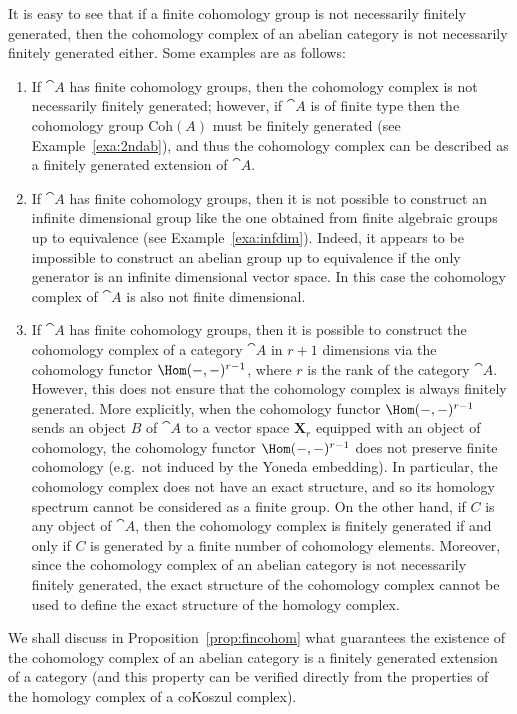 \documentclass[a4paper,reqno,oneside]{article}
\begin{document}
It is easy to see that if a finite cohomology group is not necessarily finitely generated, then the cohomology complex of an abelian category is not necessarily finitely generated either. Some examples are as follows:
\begin{enumerate}
    \item If $\cat{A}$ has finite cohomology groups, then the cohomology complex is not necessarily finitely generated; however, if $\cat{A}$ is of finite type then the cohomology group $\mathrm{Coh}(A)$ must be finitely generated (see Example~\ref{exa:2ndab}), and thus the cohomology complex can be described as a finitely generated extension of $\cat{A}$.
    \item If $\cat{A}$ has finite cohomology groups, then it is not possible to construct an infinite dimensional group like the one obtained from finite algebraic groups up to equivalence (see Example~\ref{exa:infdim}). Indeed, it appears to be impossible to construct an abelian group up to equivalence if the only generator is an infinite dimensional vector space. In this case the cohomology complex of $\cat{A}$ is also not finite dimensional.
    \item If $\cat{A}$ has finite cohomology groups, then it is possible to construct the cohomology complex of a category $\cat{A}$ in $r+1$ dimensions via the cohomology functor $\Hom(-,-)^{r-1}$, where $r$ is the rank of the category $\cat{A}$. However, this does not ensure that the cohomology complex is always finitely generated. More explicitly, when the cohomology functor $\Hom(-,-)^{r-1}$ sends an object $B$ of $\cat{A}$ to a vector space $\mathbf{X}_r$ equipped with an object of cohomology, the cohomology functor $\Hom(-,-)^{r-1}$ does not preserve finite cohomology (e.g.~not induced by the Yoneda embedding). In particular, the cohomology complex does not have an exact structure, and so its homology spectrum cannot be considered as a finite group. On the other hand, if $C$ is any object of $\cat{A}$, then the cohomology complex is finitely generated if and only if $C$ is generated by a finite number of cohomology elements. Moreover, since the cohomology complex of an abelian category is not necessarily finitely generated, the exact structure of the cohomology complex cannot be used to define the exact structure of the homology complex.
\end{enumerate}
We shall discuss in Proposition~\ref{prop:fincohom} what guarantees the existence of the cohomology complex of an abelian category is a finitely generated extension of a category (and this property can be verified directly from the properties of the homology complex of a coKoszul complex).  
\end{document}
